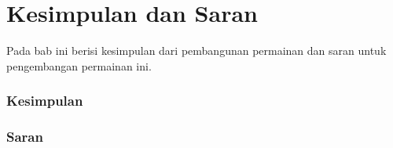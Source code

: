 \chapter{Kesimpulan dan Saran}
\label{chap:kesimpulansaran}

Pada bab ini berisi kesimpulan dari pembangunan permainan dan saran untuk pengembangan permainan ini.

\subsection{Kesimpulan}

\subsection{Saran}